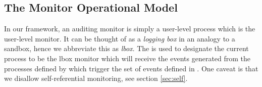 
% 
% 
% 
% 
% 
% 

\subsection{The Monitor Operational Model}

In our framework, an auditing monitor is simply a user-level process
which is the user-level monitor.
It can be thought of as a {\em logging box} in an analogy to
a sandbox, hence we abbreviate this as {\em lbox}.
The  is used to designate
the current process to be the lbox monitor which will
receive the events generated from the processes defined by 
which trigger the set of events defined in .
One caveat is that we disallow self-referential monitoring, see
section \ref{sec:self}.

